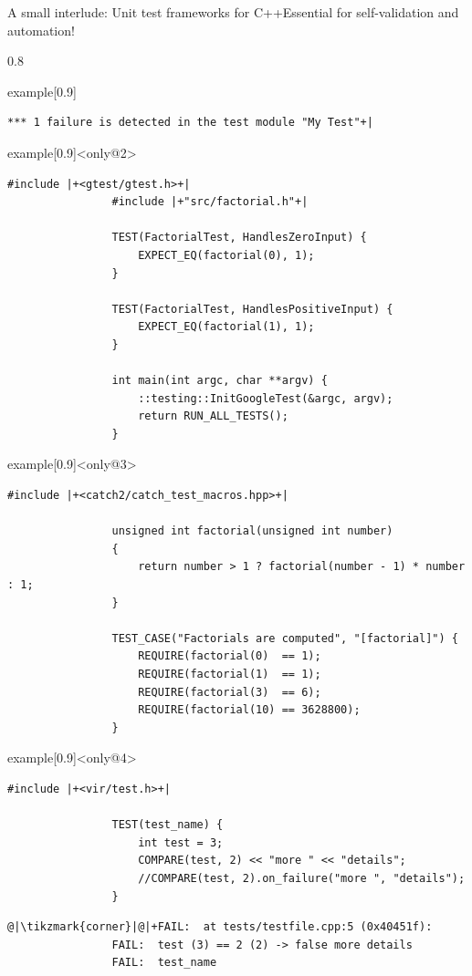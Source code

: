\begin{frame}[fragile]{A small interlude: Unit test frameworks for C++}{Essential for self-validation and automation!}
\begin{overlayarea}{\textwidth}{0.8\textheight}
\begin{varblock}{example}[0.9\textwidth]{}
\begin{lstlisting}[style=MyBash]
                *** 1 failure is detected in the test module "My Test"+|
            \end{lstlisting}
        \end{varblock}
        \begin{varblock}{example}[0.9\textwidth]{}<only@2>
            \begin{lstlisting}[style=MyCpp]
                #include |+<gtest/gtest.h>+|
                #include |+"src/factorial.h"+|

                TEST(FactorialTest, HandlesZeroInput) {
                    EXPECT_EQ(factorial(0), 1);
                }

                TEST(FactorialTest, HandlesPositiveInput) {
                    EXPECT_EQ(factorial(1), 1);
                }

                int main(int argc, char **argv) {
                    ::testing::InitGoogleTest(&argc, argv);
                    return RUN_ALL_TESTS();
                }
            \end{lstlisting}
        \end{varblock}
        \begin{varblock}{example}[0.9\textwidth]{}<only@3>
            \begin{lstlisting}[style=MyCpp]
                #include |+<catch2/catch_test_macros.hpp>+|

                unsigned int factorial(unsigned int number)
                {
                    return number > 1 ? factorial(number - 1) * number : 1;
                }

                TEST_CASE("Factorials are computed", "[factorial]") {
                    REQUIRE(factorial(0)  == 1);
                    REQUIRE(factorial(1)  == 1);
                    REQUIRE(factorial(3)  == 6);
                    REQUIRE(factorial(10) == 3628800);
                }
            \end{lstlisting}
        \end{varblock}
        \begin{varblock}{example}[0.9\textwidth]{}<only@4>
            \begin{lstlisting}[style=MyCpp]
                #include |+<vir/test.h>+|

                TEST(test_name) {
                    int test = 3;
                    COMPARE(test, 2) << "more " << "details";
                    //COMPARE(test, 2).on_failure("more ", "details");
                }
            \end{lstlisting}
            \begin{lstlisting}[style=MyBash]
                @|\tikzmark{corner}|@|+FAIL:  at tests/testfile.cpp:5 (0x40451f):
                FAIL:  test (3) == 2 (2) -> false more details
                FAIL:  test_name


\end{lstlisting}
\end{varblock}
\end{overlayarea}
\end{frame}
